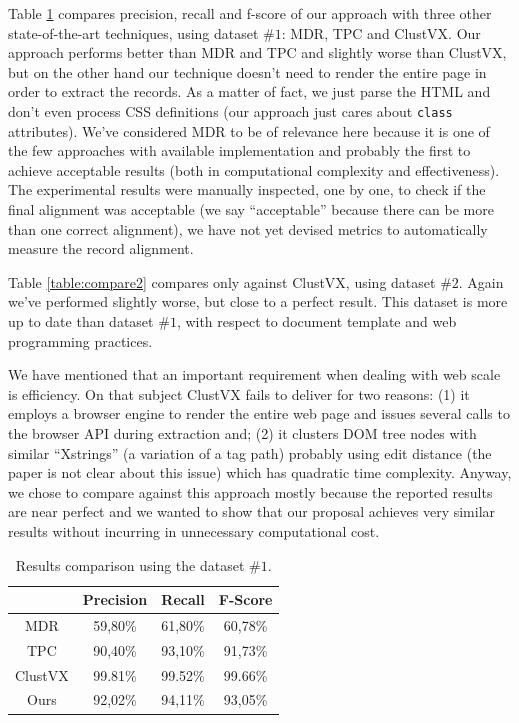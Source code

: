 \documentclass{vldb}
\begin{document}
Table \ref{table:compare1} compares precision, recall and f-score of our
approach with three other state-of-the-art techniques, using dataset $\#1$:
MDR\cite{MDR03}, TPC\cite{TPC09} and ClustVX\cite{grigalis2013towards}.
Our approach performs better than MDR and TPC and slightly worse than ClustVX,
but on the other hand our technique doesn't need to render the entire page in
order to extract the records. As a matter of fact, we just parse the HTML and
don't even process CSS definitions (our approach just cares about \texttt{class}
attributes).
We've considered MDR to be of relevance here because it is one of the few
approaches with available implementation and probably the first to achieve
acceptable results (both in computational complexity and effectiveness).
The experimental results were manually inspected, one by one, to check if the
final alignment was acceptable (we say ``acceptable'' because there can be more
than one correct alignment), we have not yet devised metrics to automatically
measure the record alignment.

Table \ref{table:compare2} compares only against ClustVX, using dataset $\#2$.
Again we've performed slightly worse, but close to a perfect result. This
dataset is more up to date than dataset $\#1$, with respect to document
template and web programming practices.

We have mentioned that an important requirement when dealing with web scale is
efficiency. On that subject ClustVX fails to deliver for two reasons: (1)
it employs a browser engine to render the entire web page and issues several
calls to the browser API during extraction and; (2) it clusters DOM tree nodes with
similar ``Xstrings'' (a variation of a tag path) probably using edit distance
(the paper is not clear about this issue) which has quadratic time complexity. 
Anyway, we chose to compare against this approach mostly because the
reported results are near perfect and we wanted to show that our proposal
achieves very similar results without incurring in unnecessary computational
cost.

\begin{table}[h]
\centering
\caption{Results comparison using the dataset $\#1$.}
\label{table:compare1}
\begin{tabular}
{|c| c| c| c|}\hline
	& Precision	& Recall	& F-Score\\ \hline
MDR\cite{MDR03} &	59,80\%	& 61,80\%	& 60,78\%\\ \hline
TPC\cite{TPC09}	& 90,40\%	& 93,10\%	& 91,73\%\\ \hline
ClustVX\cite{grigalis2013towards} &	99.81\% & 99.52\% & 99.66\%\\ \hline
Ours &	92,02\%	& 94,11\%	& 93,05\% \\ \hline
\end{tabular}
\end{table}
\end{document}
